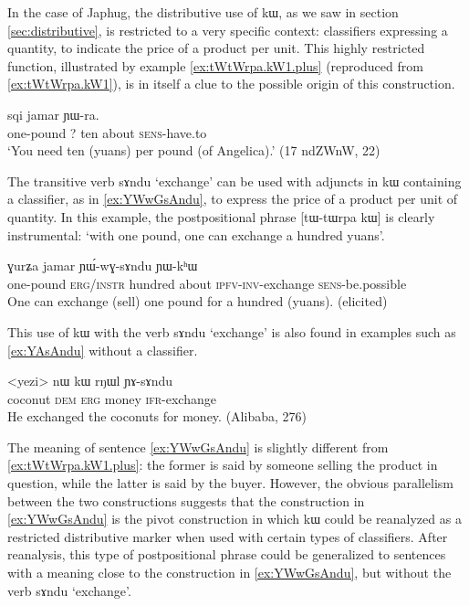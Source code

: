 \documentclass[oldfontcommands,oneside,a4paper,11pt]{article}
\newcommand{\ipa}[1]{{\phon #1}} %
\begin{document}
In the case of Japhug, the distributive use of \ipa{kɯ}, as we saw in section \ref{sec:distributive}, is restricted to a very specific context: classifiers expressing a quantity, to indicate the price of a product per unit. This highly restricted function, illustrated by example \ref{ex:tWtWrpa.kW1.plus} (reproduced from \ref{ex:tWtWrpa.kW1}), is in itself a clue to the possible origin of this construction.


 \begin{exe} 
\ex \label{ex:tWtWrpa.kW1.plus}
\gll  
[\ipa{tɯ-tɯrpa}] 	\ipa{\textbf{kɯ}} 	\ipa{sqi} 	\ipa{jamar} 	\ipa{ɲɯ-ra.} 	\\
one-pound ?{ } ten about \textsc{sens}-have.to \\
\glt `You need ten (yuans) per pound (of Angelica).' (17 ndZWnW, 22)
\end{exe}  

The transitive verb \ipa{sɤndu} `exchange' can be used with adjuncts in \ipa{kɯ} containing a classifier, as in \ref{ex:YWwGsAndu}, to express the price of a product per unit of quantity. In this example, the postpositional phrase [\ipa{tɯ-tɯrpa} 	\ipa{kɯ}] is clearly instrumental: `with one pound, one can exchange a hundred yuans'.

  \begin{exe}
\ex \label{ex:YWwGsAndu}
\gll 
[\ipa{tɯ-tɯrpa}]  	\ipa{kɯ}  	\ipa{ɣurʑa}  	\ipa{jamar}  	\ipa{ɲɯ́-wɣ-sɤndu}  	\ipa{ɲɯ-kʰɯ}  \\
one-pound \textsc{erg/instr} hundred about \textsc{ipfv-inv}-exchange \textsc{sens}-be.possible \\
\glt One can exchange (sell) one pound for a hundred (yuans). (elicited)
\end{exe}

This use of \ipa{kɯ} with the verb \ipa{sɤndu} `exchange' is also found in examples such as \ref{ex:YAsAndu} without a classifier.

  \begin{exe}
\ex \label{ex:YAsAndu}
\gll 
<yezi> 	\ipa{nɯ}  	\ipa{kɯ}  	\ipa{rŋɯl}  	\ipa{ɲɤ-sɤndu}  \\
coconut \textsc{dem} \textsc{erg} money \textsc{ifr}-exchange  \\
\glt He exchanged the coconuts for money. (Alibaba, 276)
\end{exe}

The meaning of sentence \ref{ex:YWwGsAndu} is slightly different from \ref{ex:tWtWrpa.kW1.plus}: the former is  said by someone selling the product in question, while the latter is said by the buyer. However, the obvious parallelism between the two constructions suggests that the construction in \ref{ex:YWwGsAndu} is the pivot construction in which  \ipa{kɯ} could be reanalyzed as a restricted distributive marker when used with certain types of classifiers. After reanalysis, this type of postpositional phrase could be generalized to sentences with a meaning close to the construction in \ref{ex:YWwGsAndu}, but without the verb  \ipa{sɤndu} `exchange'.
\end{document}

